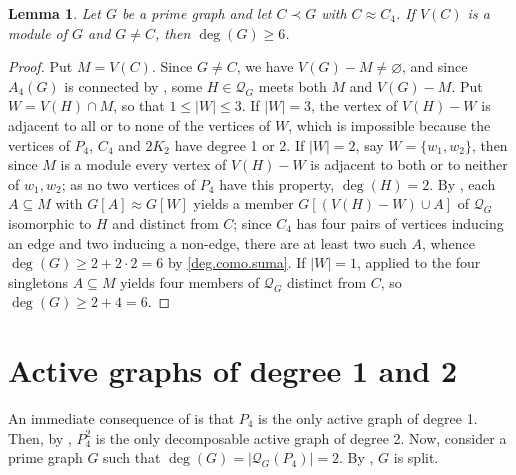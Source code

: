 \documentclass[11pt]{article}
\newtheorem{lemma}[lemma]{Lemma}
\begin{document}
\begin{lemma}
	\label{C4.modulo.deg>=6}
	Let $G$ be a prime graph and let $C\prec G$ with $C\approx C_4$. If
	$V(C)$ is a module of $G$ and $G\neq C$, then $\deg(G)\geq 6$.
\end{lemma}

\begin{proof}
	Put $M=V(C)$. Since $G\neq C$, we have $V(G)-M\neq\varnothing$, and
	since $A_4(G)$ is connected by , some
	$H\in \mathcal{Q}_G$ meets both $M$ and $V(G)-M$. Put $W=V(H)\cap M$, so
	that $1\leq|W|\leq 3$. If $|W|=3$, the vertex of $V(H)-W$ is adjacent
	to all or to none of the vertices of $W$, which is impossible because the vertices of
	$P_4$, $C_4$ and $2K_2$ have degree 1 or 2. If $|W|=2$, say $W=\{w_1,w_2\}$, then since $M$ is a module
	every vertex of $V(H)-W$ is adjacent to both or to neither of $w_1,w_2$;
	as no two vertices of $P_4$ have this property, $\deg(H)=2$. By ,
	each $A\subseteq M$ with $G[A]\approx G[W]$ yields a member
	$G[(V(H)-W)\cup A]$ of $\mathcal{Q}_G$ isomorphic to $H$ and distinct from
	$C$; since $C_4$ has four pairs of vertices inducing an edge and two
	inducing a non-edge, there are at least two such $A$, whence
	$\deg(G)\geq 2+2\cdot 2=6$ by \eqref{deg.como.suma}. If $|W|=1$,
	 applied to the four singletons
	$A\subseteq M$ yields four members of $\mathcal{Q}_G$ distinct from $C$, so
	$\deg(G)\geq 2+4=6$.
\end{proof}



\section{Active graphs of degree 1 and 2}\label{sec_deg<3}

An immediate consequence of   is that $P_4$ is the only active graph of degree 1. Then, by , $P_4^2$ is the only decomposable active graph of degree 2.
Now, consider a prime graph $G$ such that $\deg(G)=|\mathcal{Q}_G(P_4)|=2$. By  , $G$ is split. 
\end{document}
